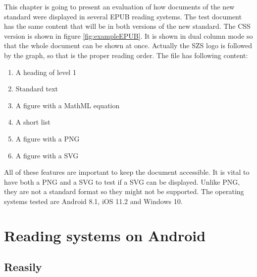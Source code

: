 This chapter is going to present an evaluation of how documents of the new standard were displayed in several EPUB reading systems. The test document has the same content that will be in both versions of the new standard. The CSS version is shown in figure \ref{fig:exampleEPUB}. It is shown in dual column mode so that the whole document can be shown at once. Actually the SZS logo is followed by the graph, so that is the proper reading order. The file has following content:

\begin{enumerate}
	\item A heading of level 1
	\item Standard text
	\item A figure with a MathML equation
	\item A short list
	\item A figure with a PNG
	\item A figure with a SVG
\end{enumerate}

All of these features are important to keep the document accessible. It is vital to have both a PNG and a SVG to test if a SVG can be displayed. Unlike PNG, they are not a standard format so they might not be supported. The operating systems tested are Android 8.1, iOS 11.2 and Windows 10.

\section{Reading systems on Android}
	
\subsection{Reasily}

